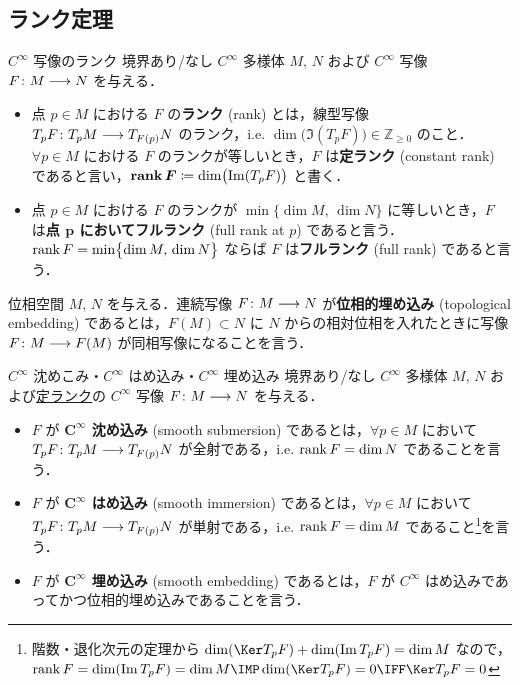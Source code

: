 \documentclass[TQFT_main]{subfiles}
\begin{document}
\subsection{ランク定理}

\begin{mydef}[label=def:rank-smooth]{$C^\infty$ 写像のランク}
    境界あり/なし $C^\infty$ 多様体 $M,\, N$ および $C^\infty$ 写像 $F \colon M \longrightarrow N$ を与える．
    \begin{itemize}
        \item 点 $p \in M$ における $F$ の\textbf{ランク} (rank) とは，線型写像 $T_p F \colon T_p M \longrightarrow T_{F(p)} N$ のランク，i.e. $\dim \bigl(\Im (T_p F)\bigr) \in \mathbb{Z}_{\ge 0}$ のこと．$\forall p \in M$ における $F$ のランクが等しいとき，$F$ は\textbf{定ランク} (constant rank) であると言い，$\bm{\rank F} \coloneqq \dim \bigl(\Im (T_p F)\bigr)$ と書く．
        \item 点 $p \in M$ における $F$ のランクが $\min \bigl\{\dim M,\, \dim N\bigr\}$ に等しいとき，$F$ は\textbf{点 $\bm{p}$ においてフルランク} (full rank at $p$) であると言う．
        $\rank F = \min \bigl\{\dim M,\, \dim N\bigr\}$ ならば $F$ は\textbf{フルランク} (full rank) であると言う．
    \end{itemize}
\end{mydef}

位相空間 $M,\, N$ を与える．連続写像 $F \colon M \longrightarrow N$ が\textbf{位相的埋め込み} (topological embedding) であるとは，$F(M) \subset N$ に $N$ からの相対位相を入れたときに写像 $F \colon M \longrightarrow F(M)$ が同相写像になることを言う．

\begin{mydef}[label=def:submersion-smooth]{$C^\infty$ 沈めこみ・$C^\infty$ はめ込み・$C^\infty$ 埋め込み}
    境界あり/なし $C^\infty$ 多様体 $M,\, N$ および\hyperref[def:rank-smooth]{定ランク}の $C^\infty$ 写像 $F \colon M \longrightarrow N$ を与える．
    \begin{itemize}
        \item $F$ が\textbf{ $\bm{C^\infty}$ 沈め込み} (smooth submersion) であるとは，$\forall p \in M$ において $T_p F \colon T_p M \longrightarrow T_{F(p)} N$ が全射である，i.e. $\rank F = \dim N$ であることを言う．
        \item $F$ が\textbf{ $\bm{C^\infty}$ はめ込み} (smooth immersion) であるとは，$\forall p \in M$ において $T_p F \colon T_p M \longrightarrow T_{F(p)} N$ が単射である，i.e. $\rank F = \dim M$ であること\footnote{階数・退化次元の定理から $\dim (\Ker T_p F) + \dim (\Im T_p F) = \dim M$ なので，$\rank F = \dim (\Im T_p F) = \dim M \IMP \dim (\Ker T_p F) = 0 \IFF \Ker T_p F = 0$}を言う．
        \item $F$ が\textbf{ $\bm{C^\infty}$ 埋め込み} (smooth embedding) であるとは，$F$ が $C^\infty$ はめ込みであってかつ位相的埋め込みであることを言う．
    \end{itemize}
\end{mydef}
\end{document}
